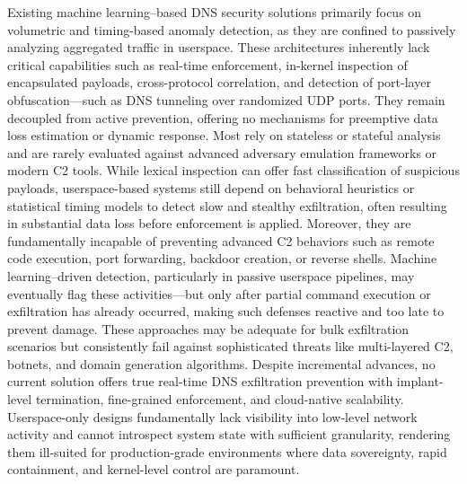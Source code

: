 \documentclass [11pt, proquest] {uwthesis}[2020/02/24]
\begin{document}
Existing machine learning–based DNS security solutions primarily focus on volumetric and timing-based anomaly detection, as they are confined to passively analyzing aggregated traffic in userspace. These architectures inherently lack critical capabilities such as real-time enforcement, in-kernel inspection of encapsulated payloads, cross-protocol correlation, and detection of port-layer obfuscation—such as DNS tunneling over randomized UDP ports. They remain decoupled from active prevention, offering no mechanisms for preemptive data loss estimation or dynamic response. Most rely on stateless or stateful analysis and are rarely evaluated against advanced adversary emulation frameworks or modern C2 tools. While lexical inspection can offer fast classification of suspicious payloads, userspace-based systems still depend on behavioral heuristics or statistical timing models to detect slow and stealthy exfiltration, often resulting in substantial data loss before enforcement is applied. Moreover, they are fundamentally incapable of preventing advanced C2 behaviors such as remote code execution, port forwarding, backdoor creation, or reverse shells. Machine learning–driven detection, particularly in passive userspace pipelines, may eventually flag these activities—but only after partial command execution or exfiltration has already occurred, making such defenses reactive and too late to prevent damage. These approaches may be adequate for bulk exfiltration scenarios but consistently fail against sophisticated threats like multi-layered C2, botnets, and domain generation algorithms. Despite incremental advances, no current solution offers true real-time DNS exfiltration prevention with implant-level termination, fine-grained enforcement, and cloud-native scalability. Userspace-only designs fundamentally lack visibility into low-level network activity and cannot introspect system state with sufficient granularity, rendering them ill-suited for production-grade environments where data sovereignty, rapid containment, and kernel-level control are paramount.
\end{document}
